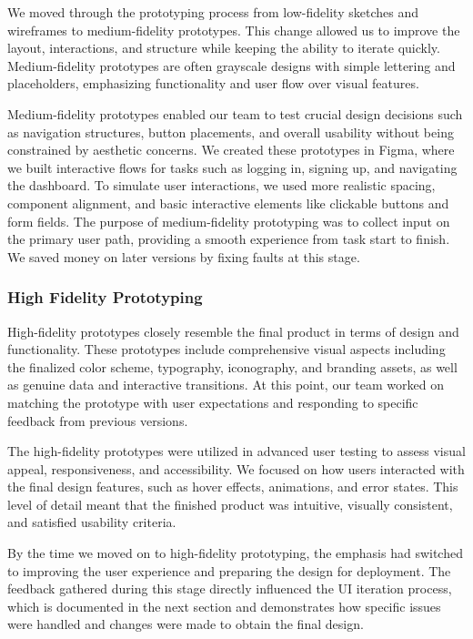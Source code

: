 We moved through the prototyping process from low-fidelity sketches and wireframes to medium-fidelity prototypes. This change allowed us to improve the layout, interactions, and structure while keeping the ability to iterate quickly. Medium-fidelity prototypes are often grayscale designs with simple lettering and placeholders, emphasizing functionality and user flow over visual features.

Medium-fidelity prototypes enabled our team to test crucial design decisions such as navigation structures, button placements, and overall usability without being constrained by aesthetic concerns. We created these prototypes in Figma, where we built interactive flows for tasks such as logging in, signing up, and navigating the dashboard. To simulate user interactions, we used more realistic spacing, component alignment, and basic interactive elements like clickable buttons and form fields.
The purpose of medium-fidelity prototyping was to collect input on the primary user path, providing a smooth experience from task start to finish. We saved money on later versions by fixing faults at this stage.

\subsubsection{High Fidelity Prototyping}
High-fidelity prototypes closely resemble the final product in terms of design and functionality. These prototypes include comprehensive visual aspects including the finalized color scheme, typography, iconography, and branding assets, as well as genuine data and interactive transitions. At this point, our team worked on matching the prototype with user expectations and responding to specific feedback from previous versions.

The high-fidelity prototypes were utilized in advanced user testing to assess visual appeal, responsiveness, and accessibility. We focused on how users interacted with the final design features, such as hover effects, animations, and error states. This level of detail meant that the finished product was intuitive, visually consistent, and satisfied usability criteria.

By the time we moved on to high-fidelity prototyping, the emphasis had switched to improving the user experience and preparing the design for deployment. The feedback gathered during this stage directly influenced the UI iteration process, which is documented in the next section and demonstrates how specific issues were handled and changes were made to obtain the final design.



